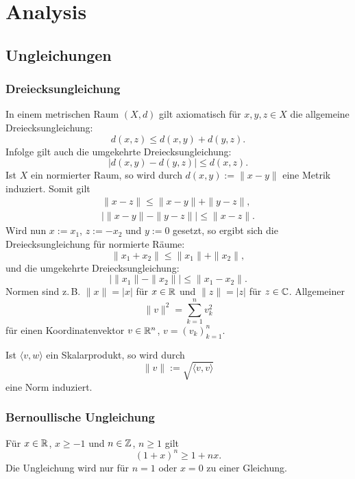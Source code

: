 
\chapter{Analysis}
\section{Ungleichungen}
\subsection{Dreiecksungleichung}
In einem metrischen Raum $(X,d)$ gilt axiomatisch für $x,y,z\in X$
die allgemeine Dreiecksungleichung:
\begin{equation}
d(x,z) \le d(x,y)+d(y,z).
\end{equation}
Infolge gilt auch die umgekehrte Dreiecksungleichung:
\begin{equation}
|d(x,y)-d(y,z)|\le d(x,z).
\end{equation}
Ist $X$ ein normierter Raum, so wird durch $d(x,y) := \|x-y\|$
eine Metrik induziert. Somit gilt
\begin{gather}
\|x-z\| \le \|x-y\|+\|y-z\|,\\
|\|x-y\|-\|y-z\|| \le \|x-z\|.
\end{gather}
Wird nun $x:=x_1$, $z:=-x_2$ und $y:=0$ gesetzt, so ergibt sich
die Dreiecksungleichung für normierte Räume:
\begin{equation}
\|x_1+x_2\| \le \|x_1\|+\|x_2\|,
\end{equation}
und die umgekehrte Dreiecksungleichung:
\begin{equation}
|\|x_1\|-\|x_2\||\le \|x_1-x_2\|.
\end{equation}
Normen sind z.\,B. $\|x\|=|x|$ für $x\in\mathbb R$ und $\|z\|=|z|$ für
$z\in\mathbb C$. Allgemeiner
\begin{equation}
\|v\|^2 = \sum_{k=1}^n v_k^2
\end{equation}
für einen Koordinatenvektor $v\in\mathbb R^n$, $v=(v_k)_{k=1}^n$.

Ist $\langle v,w\rangle$ ein Skalarprodukt, so wird durch
\begin{equation}
\|v\| := \sqrt{\langle v,v\rangle}
\end{equation}
eine Norm induziert.

\subsection{Bernoullische Ungleichung}
Für $x\in\mathbb R$, $x\ge -1$ und $n\in\mathbb Z$, $n\ge 1$ gilt
\begin{equation}
(1+x)^n \ge 1+nx.
\end{equation}
Die Ungleichung wird nur für $n=1$ oder $x=0$ zu einer Gleichung.

